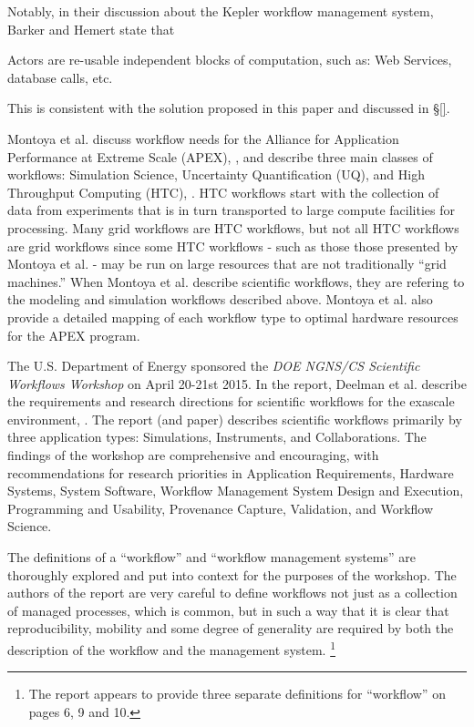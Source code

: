 Notably, in their discussion about the Kepler workflow management
system, Barker and Hemert state that

\begin{displayquote}
Actors are re-usable independent blocks of computation, such as:
Web Services, database calls, etc.
\end{displayquote}

This is consistent with the solution proposed in this paper and discussed in \S \ref{}.

Montoya et al. discuss workflow needs for the Alliance for Application
Performance at Extreme Scale (APEX), \cite{nersc_apex_2016}, and describe
three main classes of workflows: Simulation Science, Uncertainty
Quantification (UQ), and High Throughput Computing (HTC),
\cite{montoya_apex_2016}.
HTC workflows start with the collection of data from experiments that is in turn
transported to large compute facilities for
processing. Many grid workflows are HTC workflows, but not all HTC
workflows are grid workflows since some HTC workflows - such as those
those presented by Montoya et al. - may be run on large resources that
are not traditionally ``grid machines.'' When Montoya et al. describe scientific workflows,
they are refering to the modeling and simulation workflows described above. Montoya et al. also provide a
detailed mapping of each workflow type to optimal hardware resources for the APEX
program.

The U.S. Department of Energy sponsored the \emph{DOE NGNS/CS Scientific
Workflows Workshop} on April 20-21st 2015. In the report, Deelman et al.
describe the requirements and research directions for scientific
workflows for the exascale environment, \cite{deelman_future_2015}\cite{deelman_future_2017}. The report (and paper) describes scientific workflows primarily by three application types:
Simulations, Instruments, and Collaborations. The findings of the workshop are
comprehensive and encouraging, with recommendations for research
priorities in Application Requirements, Hardware Systems, System
Software, Workflow Management System Design and Execution, Programming and Usability,
Provenance Capture, Validation, and Workflow Science.

The definitions of a ``workflow'' and ``workflow management systems''
are thoroughly explored and put into context for the purposes of the
workshop. The authors of the report are very careful to define workflows
not just as a collection of managed processes, which is common, but in
such a way that it is clear that reproducibility, mobility and some
degree of generality are required by both the description of the
workflow and the management system. \footnote{The report appears to provide
three separate definitions for ``workflow'' on pages 6, 9 and 10.}

